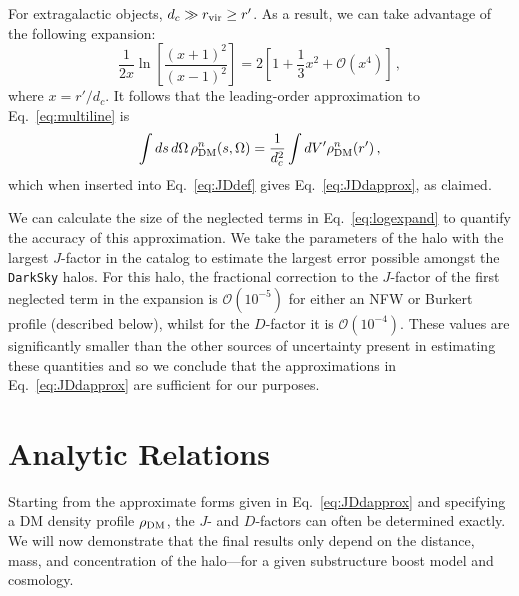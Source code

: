For extragalactic objects, $d_c \gg r_{\rm vir} \geq r'$.  As a result, we can take advantage of the following  expansion:
\begin{equation}
\frac{1}{2x} \ln \left[ \frac{(x+1)^2}{(x-1)^2} \right]  = 2 \left[ 1 + \frac{1}{3} x^2 + \mathcal{O} \left(x^4\right) \right] \, ,
\label{eq:logexpand}
\end{equation}
where $x= r'/d_c$.  It follows that the leading-order approximation to Eq.~\ref{eq:multiline} is \begin{equation}\begin{aligned}
\int ds \, d\Omega \,\rho_{\rm DM}^n(s,\Omega) = \frac{1}{d_c^2} \int dV' \rho_{\rm DM}^n(r') \,,
\end{aligned}\end{equation}
which when inserted into Eq.~\ref{eq:JDdef} gives Eq.~\ref{eq:JDdapprox}, as claimed. 

We can calculate the size of the neglected terms in Eq.~\ref{eq:logexpand} to quantify the accuracy of this approximation.  We take the parameters of the halo with the largest $J$-factor in the catalog to estimate the largest error possible amongst the \texttt{DarkSky} halos.  For this halo, the fractional correction to the $J$-factor of the first neglected term in the expansion is $\mathcal{O}(10^{-5})$ for either an NFW or Burkert profile (described below), whilst for the $D$-factor it is $\mathcal{O}(10^{-4})$. These values are significantly smaller than the other sources of uncertainty present in estimating these quantities and so we conclude that the approximations in Eq.~\ref{eq:JDdapprox} are sufficient for our purposes.



\section{Analytic Relations}

Starting from the approximate forms given in Eq.~\ref{eq:JDdapprox} and specifying a DM density profile $\rho_{\rm DM}$, the $J$- and $D$-factors can often be determined exactly.   We will now demonstrate that the final results only depend on the distance, mass, and concentration of the halo---for a given substructure boost model and cosmology.

